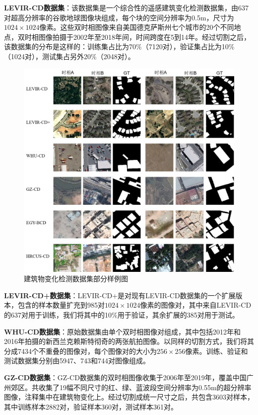 \documentclass[lang=chs, degree=master, blindreview=false, adobe=false]{yanputhesis}
\begin{document}
\textbf{LEVIR-CD数据集}：该数据集是一个综合性的遥感建筑变化检测数据集，由637对超高分辨率的谷歌地球图像块组成，每个块的空间分辨率为0.5m，尺寸为$1024\times1024$像素。这些双时相图像来自美国德克萨斯州七个城市的20个不同地点，双时相图像拍摄于2002年至2018年间，时间跨度在5到14年。经过切割之后，该数据集的分布是这样的：训练集占比为70$\%$（7120对），验证集占比为10$\%$（1024对），测试集占另外20$\%$（2048对）。
\begin{figure}[!htb]
  \centering
  \includegraphics[scale=0.65]{images/building_sample.png}
  \caption{
    建筑物变化检测数据集部分样例图
  }
  \label{fig:building_sample}
\end{figure}

\textbf{LEVIR-CD+数据集}：LEVIR-CD+是对现有LEVIR-CD数据集的一个扩展版本，包含的样本数量扩充到985对$1024\times1024$像素的图像对，其中来自LEVIR-CD的637对用于训练，我们将其中的10$\%$用于验证，其余扩展的385对用于测试。

\textbf{WHU-CD数据集}：原始数据集由单个双时相图像对组成，其中包括2012年和2016年拍摄的新西兰克赖斯特彻奇的两张航拍图像。以同样的切割方式，我们将其分成7434个不重叠的图像对，每个图像对的大小为$256\times256$像素。训练、验证和测试数据集分别由5947、743和744对图像组成。

\textbf{GZ-CD数据集}：GZ-CD数据集的双时相图像收集于2006年至2019年，覆盖中国广州郊区。共收集了19幅不同尺寸的红、绿、蓝波段空间分辨率为0.55m的超分辨率图像，注释集中在建筑物变化上。经过切割成统一尺寸之后，共包含3603对样本，其中训练样本2882对，验证样本360对，测试样本361对。
\end{document}
